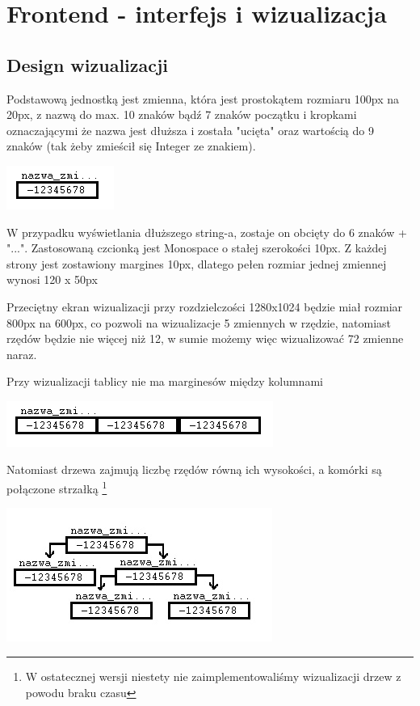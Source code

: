 \documentclass[a4paper,twoside,openright,11pt]{report}
\begin{document}
  \chapter{Frontend - interfejs i wizualizacja}
  
  \section {Design wizualizacji}
\par Podstawową jednostką jest zmienna, która jest prostokątem rozmiaru 100px na 20px, z nazwą do max. 10 znaków bądź 7 znaków początku i kropkami oznaczającymi że nazwa jest dłuższa i została "ucięta" oraz wartością do 9 znaków (tak żeby zmieścił się Integer ze znakiem). 

\begin{center}
  \includegraphics[scale=0.8]{wiz1}
\end{center}

\par W przypadku wyświetlania dłuższego string-a, zostaje on obcięty do 6 znaków + "...".
Zastosowaną czcionką jest Monospace o stałej szerokości 10px. Z każdej strony jest zostawiony margines 10px, dlatego pełen rozmiar jednej zmiennej wynosi 120 x 50px 
\par Przeciętny ekran wizualizacji przy rozdzielczości 1280x1024 będzie miał rozmiar 800px na 600px, co pozwoli na wizualizacje 5 zmiennych w rzędzie, natomiast rzędów będzie nie więcej niż 12, w sumie możemy więc wizualizować 72 zmienne naraz. 
\par Przy wizualizacji tablicy nie ma marginesów między kolumnami 

\begin{center}
  \includegraphics[scale=0.8]{wiz2}
\end{center}
	
\par Natomiast drzewa zajmują liczbę rzędów równą ich wysokości, a komórki są połączone strzałką \footnote{W ostatecznej wersji niestety nie zaimplementowaliśmy wizualizacji drzew z powodu braku czasu}

\begin{center}
  \includegraphics[scale=0.8]{wiz3}
\end{center}
\end{document}
